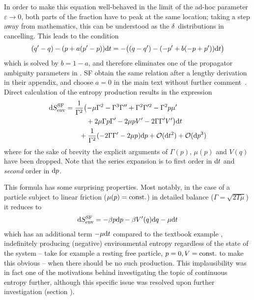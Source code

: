 In order to make this equation well-behaved in the limit of the ad-hoc parameter \(\varepsilon\to0\), both parts of the fraction have to peak at the same location; taking a step away from mathematics, this can be understood as the \(\delta\)~distributions in  cancelling. This leads to the condition 
%
\begin{equation}
	(q'-q)-(p+a(p'-p))\mathrm{d} t = -\bigl((q-q') - (-p'+b(-p+p'))\mathrm{d} t\bigr)
\end{equation}
%
which is solved by \(b = 1 - a\), and therefore eliminates one of the propagator ambiguity parameters in . SF obtain the same relation after a lengthy derivation in their appendix, and choose \(a = 0\) in the main text without further comment~\cite{sf}. Direct calculation of the entropy production results in the expression 
%
\begin{equation}\begin{split}
	\label{eqn:sf entropy production}
	\mathrm{d}S_\text{env}^{\text{SF}}
	&=\frac1{\Gamma^2}\bigl(
		- \mu\Gamma^2
		- \Gamma^3\Gamma''
		+ \Gamma^2\Gamma'^2
		- \Gamma^2p\mu'
	\\&\qquad\quad
		+ 2\mu\Gamma p\Gamma'
		- 2\mu pV'
		- 2 \Gamma\Gamma'V'
		\bigr) \mathrm{d} t
	\\&\qquad
		+\frac1{\Gamma^2}
		(-2\Gamma\Gamma' - 2\mu p) \mathrm{d} p
		+ \mathcal{O}(\mathrm{d} t^2) +  \mathcal{O}(\mathrm{d} p^3)
\end{split}\end{equation}
%
where for the sake of brevity the explicit arguments of \(\Gamma(p)\), \(\mu(p)\) and \(V(q)\) have been dropped.
Note that the series expansion is to first order in \(\mathrm{d} t\) and \emph{second} order in \(\mathrm{d} p\).

This formula has some surprising properties. Most notably, in the case of a particle subject to linear friction (\(\mu(p) = \mathrm{const.}\)) in detailed balance (\(\Gamma = \sqrt{2T\mu}\)) it reduces to
%
\begin{align}
	\mathrm{d}S_\text{env}^{\text{SF}} = -\beta p \mathrm{d} p - \beta V'(q) \mathrm{d} q - \mu \mathrm{d} t
\end{align}
%
which has an additional term \(- \mu \mathrm{d} t\) compared to the textbook example , indefinitely producing (negative) environmental entropy regardless of the state of the system -- take for example a resting free particle, \(p=0,V=\mathrm{const.}\) to make this obvious -- when there should be no such production. This implausibility was in fact one of the motivations behind investigating the topic of continuous entropy further, although this specific issue was resolved upon further investigation (section ).

